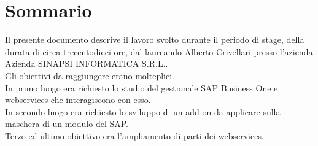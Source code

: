 
\cleardoublepage
{}
{}
\begingroup
\let\clearpage\relax
\let\cleardoublepage\relax
\let\cleardoublepage\relax

\chapter*{Sommario}

Il presente documento descrive il lavoro svolto durante il periodo di stage, della durata di circa trecentodieci ore, dal laureando Alberto Crivellari presso l'azienda Azienda SINAPSI INFORMATICA S.R.L..\\
Gli obiettivi da raggiungere erano molteplici.\\
In primo luogo era richiesto lo studio del gestionale SAP Business One e webservices che interagiscono con esso.\\
In secondo luogo era richiesto lo sviluppo di un add-on da applicare sulla maschera di un modulo del SAP.\\
Terzo ed ultimo obiettivo era l'ampliamento di parti dei webservices.

%
%

\endgroup			

\vfill

